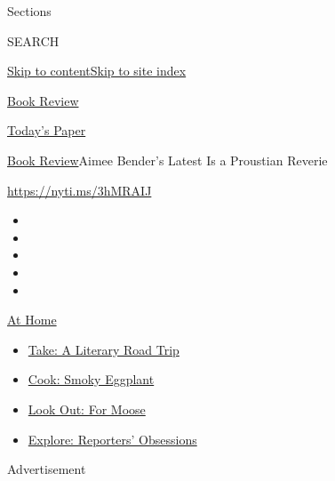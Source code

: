 Sections

SEARCH

\protect\hyperlink{site-content}{Skip to
content}\protect\hyperlink{site-index}{Skip to site index}

\href{https://www.nytimes.com/section/books/review}{Book Review}

\href{https://myaccount.nytimes.com/auth/login?response_type=cookie\&client_id=vi}{}

\href{https://www.nytimes.com/section/todayspaper}{Today's Paper}

\href{/section/books/review}{Book Review}\textbar{}Aimee Bender's Latest
Is a Proustian Reverie

\url{https://nyti.ms/3hMRAIJ}

\begin{itemize}
\item
\item
\item
\item
\item
\end{itemize}

\href{https://www.nytimes.com/spotlight/at-home?action=click\&pgtype=Article\&state=default\&region=TOP_BANNER\&context=at_home_menu}{At
Home}

\begin{itemize}
\tightlist
\item
  \href{https://www.nytimes.com/2020/07/28/books/time-for-a-literary-road-trip.html?action=click\&pgtype=Article\&state=default\&region=TOP_BANNER\&context=at_home_menu}{Take:
  A Literary Road Trip}
\item
  \href{https://www.nytimes.com/2020/07/29/magazine/bored-with-your-home-cooking-some-smoky-eggplant-will-fix-that.html?action=click\&pgtype=Article\&state=default\&region=TOP_BANNER\&context=at_home_menu}{Cook:
  Smoky Eggplant}
\item
  \href{https://www.nytimes.com/2020/07/27/travel/moose-michigan-isle-royale.html?action=click\&pgtype=Article\&state=default\&region=TOP_BANNER\&context=at_home_menu}{Look
  Out: For Moose}
\item
  \href{https://www.nytimes.com/interactive/2020/at-home/even-more-reporters-editors-diaries-lists-recommendations.html?action=click\&pgtype=Article\&state=default\&region=TOP_BANNER\&context=at_home_menu}{Explore:
  Reporters' Obsessions}
\end{itemize}

Advertisement

